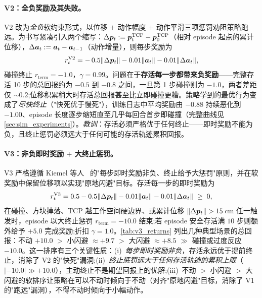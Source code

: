\paragraph{V2：全负奖励及其失败。}V2 改为\emph{全负}软约束形式，以位移 $+$ 动作幅度 $+$ 动作平滑三项惩罚劝阻策略跑远。为书写紧凑引入两个缩写：$\Delta\bm{p}_t := \bm{p}_t^{\text{TCP}} - \bm{p}_0^{\text{TCP}}$（相对 episode 起点的累计位移），$\Delta\bm{a}_t := \bm{a}_t - \bm{a}_{t-1}$（动作增量），则每步奖励为
\begin{equation*}
  r_t^{\text{V2}} = -\, 0.5 \lVert\Delta\bm{p}_t\rVert - 0.01 \lVert\bm{a}_t\rVert - 0.01 \lVert\Delta\bm{a}_t\rVert,
\end{equation*}
碰撞终止 $r_{\text{term}} = -1.0$，$\gamma = 0.99$。问题在于\textbf{存活每一步都带来负奖励}——完整存活 10 步的总回报约为 $-0.5$ 到 $-0.8$ 之间，一旦第 1 步碰撞则为 $-1.0$，两者差距仅 $\sim 0.2$;位移积累稍大时存活总回报甚至比立即碰撞更糟。策略学到的最优行为变成了\emph{尽快终止}（"快死优于慢死"），训练日志中平均奖励由 $-0.88$ 持续恶化到 $-1.00$、episode 长度逐步缩短直至几乎每回合首步即碰撞（完整曲线见\cref{sec:sim_experiments}）。\emph{教训}：存活必须严格优于任何终止——即时奖励不能为负，且终止惩罚必须远大于任何可能的存活轨迹累积回报。

\paragraph{V3：非负即时奖励 $+$ 大终止惩罚。}V3 严格遵循 Kiemel 等人~\cite{kiemel2024safe} 的"每步即时奖励非负、终止给予大惩罚"原则，并在软奖励中保留位移项以实现"原地闪避"目标。存活每一步的即时奖励为
\begin{equation*}
  r_t^{\text{V3}} = 0.5 - 0.5 \lVert\Delta\bm{p}_t\rVert - 0.01 \lVert\bm{a}_t\rVert - 0.01 \lVert\Delta\bm{a}_t\rVert \;\geq\; 0,
\end{equation*}
在碰撞、方块掉落、TCP 越工作空间硬边界、或累计位移 $\lVert\Delta\bm{p}_t\rVert > 15$\,cm 任一触发时，episode 以大终止惩罚 $r_{\text{term}} = -10.0$ 结束;若 episode 安全存活满 $10$ 步则额外给予 $+5.0$ 完成奖励;折扣 $\gamma = 1.0$。\cref{tab:v3_returns} 列出几种典型场景的总回报：不动 $+10.0$ $>$ 小闪避 $\approx +9.7$ $>$ 大闪避 $\approx +8.5$ $\gg$ 碰撞或过度反应 $-10.0$。这一排序有三个关键性质：(i)~\emph{每步即时奖励非负}，存活永远优于提前终止，消除了 V2 的"快死"漏洞;(ii)~\emph{终止惩罚远大于任何存活轨迹的累积上限}（$|{-10.0}| \gg +10.0$），主动终止不是期望回报上的优解;(iii)~不动 $>$ 小闪避 $>$ 大闪避的软排序让策略在可以不动时倾向于不动（对齐"原地闪避"目标，消除了 V1 的"跑远"漏洞），不得不动时倾向于小幅动作。

